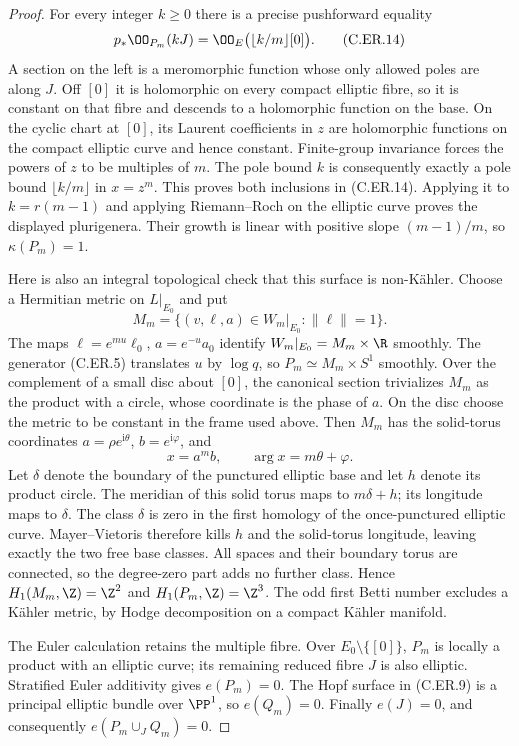 \begin{proof}
For every integer $k\ge0$ there is a precise pushforward equality
\[
        p_*\OO_{P_m}(kJ)
          =\OO_E\bigl(\lfloor k/m\rfloor[0]\bigr).
                                                        \tag{C.ER.14}
\]
A section on the left is a meromorphic function whose only allowed
poles are along $J$. Off $[0]$ it is holomorphic on every compact
elliptic fibre, so it is constant on that fibre and descends to a
holomorphic function on the base. On the cyclic chart at $[0]$,
its Laurent coefficients in $z$ are holomorphic functions on the
compact elliptic curve and hence constant. Finite-group invariance
forces the powers of $z$ to be multiples of $m$. The pole bound
$k$ is consequently exactly a pole bound $\lfloor k/m\rfloor$
in $x=z^m$. This proves both inclusions in (C.ER.14).
Applying it to $k=r(m-1)$ and applying Riemann--Roch on the elliptic
curve proves the displayed plurigenera. Their growth is linear
with positive slope $(m-1)/m$, so $\kappa(P_m)=1$.

Here is also an integral topological check that this surface is
non-K\"ahler. Choose a Hermitian metric on $L|_{E_0}$ and put
\[
 M_m=\{(v,\ell,a)\in W_m|_{E_0}:\|\ell\|=1\}.
                                                        \tag{C.ER.15}
\]
The maps $\ell=e^{mu}\ell_0$, $a=e^{-u}a_0$ identify
$W_m|_{E_0}=M_m\times\R$ smoothly. The generator (C.ER.5)
translates $u$ by $\log q$, so
$P_m\simeq M_m\times S^1$ smoothly. Over the complement of a
small disc about $[0]$, the canonical section trivializes $M_m$
as the product with a circle, whose coordinate is the phase of $a$.
On the disc choose the metric to be constant in the frame used
above. Then $M_m$ has the solid-torus coordinates
$a=\rho e^{\mathrm i\theta}$, $b=e^{\mathrm i\varphi}$, and
\[
              x=a^m b,\qquad \arg x=m\theta+\varphi.
                                                        \tag{C.ER.16}
\]
Let $\delta$ denote the boundary of the punctured elliptic base
and let $h$ denote its product circle. The meridian of this solid
torus maps to $m\delta+h$; its longitude maps to $\delta$.
The class $\delta$ is zero in the first homology of the once-punctured
elliptic curve. Mayer--Vietoris therefore kills $h$ and the solid-torus
longitude, leaving exactly the two free base classes. All spaces
and their boundary torus are connected, so the degree-zero part
adds no further class. Hence
$H_1(M_m,\Z)=\Z^2$ and $H_1(P_m,\Z)=\Z^3$.
The odd first Betti number excludes a K\"ahler metric, by Hodge
decomposition on a compact K\"ahler manifold.

The Euler calculation retains the multiple fibre. Over
$E_0\setminus\{[0]\}$, $P_m$ is locally a product with an elliptic
curve; its remaining reduced fibre $J$ is also elliptic.
Stratified Euler additivity gives $e(P_m)=0$.
The Hopf surface in (C.ER.9) is a principal elliptic bundle over
$\PP^1$, so $e(Q_m)=0$. Finally $e(J)=0$, and consequently
$e(P_m\cup_JQ_m)=0$.


\end{proof}
